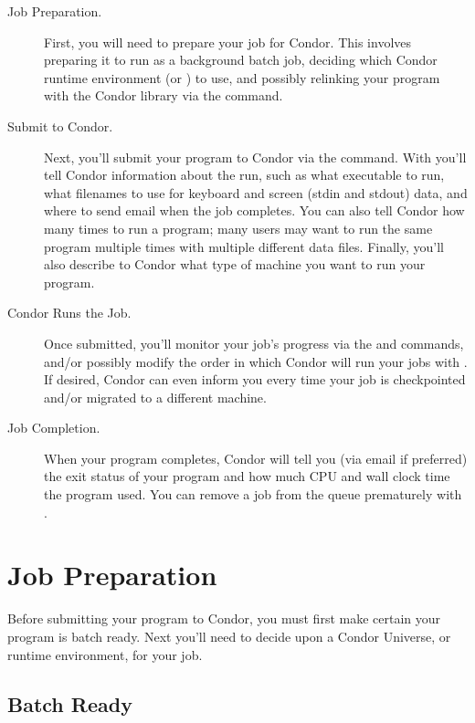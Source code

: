 \begin{description}

\item[Job Preparation.]First, you will need to prepare your job for
Condor. This involves preparing it to run as a background batch job,
deciding which Condor runtime environment (or ) to use,
and possibly relinking your program with the Condor library via the
 command. 

\item[Submit to Condor.]Next, you'll submit your program to Condor via
the  command. With  you'll tell Condor
information about the run, such as what executable to run, what
filenames to use for keyboard and screen (stdin and stdout) data, and
where to send email when the job completes. You can also tell Condor how
many times to run a program; many users may want to run the same program
multiple times with multiple different data files. Finally, you'll also
describe to Condor what type of machine you want to run your program. 

\item[Condor Runs the Job.]Once submitted, you'll monitor your job's
progress via the  and  commands, and/or
possibly modify the order in which Condor will run your jobs with
. If desired, Condor can even inform you every time your job
is checkpointed and/or migrated to a different machine. 

\item[Job Completion.]When your program completes, Condor will tell you
(via email if preferred) the exit status of your program and how much
CPU and wall clock time the program used. You can remove a job from the
queue prematurely with . 

\end{description}  %


\section{Job Preparation}

Before submitting your program to Condor, you must first make certain
your program is batch ready.  Next you'll need to decide upon a Condor
Universe, or runtime environment, for your job.

\subsection{Batch Ready}

